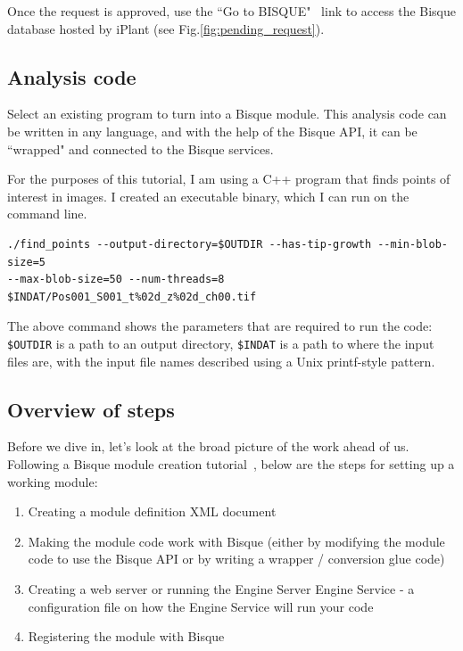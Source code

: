 \documentclass[12pt]{article}
\begin{document}
Once the request is approved, use the 
``Go to BISQUE"~\cite{Bisque-iplant} link to access the 
Bisque database hosted by iPlant (see Fig.\ref{fig:pending_request}).


\subsection{Analysis code}
\label{sec:analysis_code}

Select an existing program to turn into a Bisque module.
This analysis code can be written in any language, and with the help
of the Bisque API, it can be ``wrapped" and connected to the
Bisque services.

For the purposes of this tutorial, I am using a C++ program
that finds points of interest in images. 
I created an executable binary, which I can run on the command line.

\begin{verbatim}
./find_points --output-directory=$OUTDIR --has-tip-growth --min-blob-size=5 
--max-blob-size=50 --num-threads=8 $INDAT/Pos001_S001_t%02d_z%02d_ch00.tif
\end{verbatim}

The above command shows the parameters that are required
to run the code: \texttt{\$OUTDIR} is a path to an output
directory, \texttt{\$INDAT} is a path to where the input files are, 
with the input file names described using a Unix printf-style pattern.

\subsection{Overview of steps}
Before we dive in, let's look at the broad picture of the work ahead of us.
Following a Bisque module creation tutorial~\cite{Bisque-module-creation}, below are the steps for setting up a working module:
\begin{enumerate}
\item Creating a module definition XML document
\item Making the module code work with Bisque (either by modifying the module code to use the Bisque API or by writing a wrapper / conversion glue code)
\item Creating a web server or running the Engine Server
\subitem Engine Service - a configuration file on how the Engine Service will run your code 
\item Registering the module with Bisque 
\end{enumerate}




{\small


}
\end{document}

